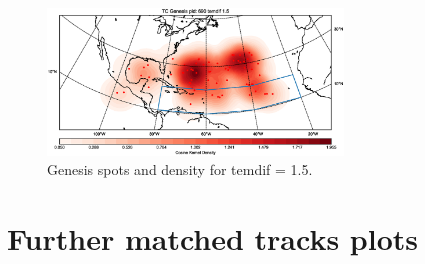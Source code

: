 \begin{figure}[ht]
	\centering
	\includegraphics[width=0.7\textwidth]{img/genesis_plot_temdif15.eps}
	\caption{Genesis spots and density for temdif = 1.5.}
\end{figure}


\chapter{Further matched tracks plots}\label{sec:matching-appendix}

